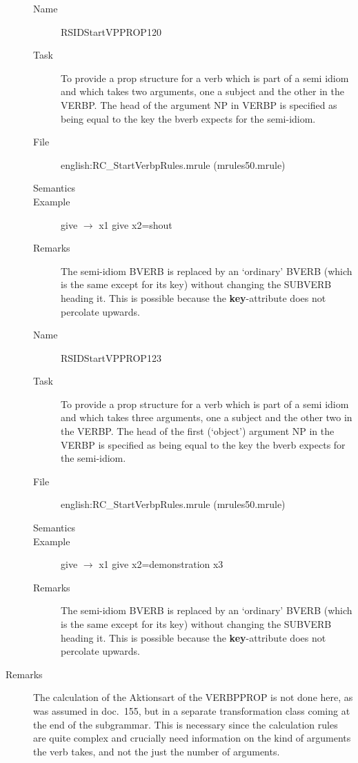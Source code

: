 \begin{description}
\vspace{1 cm}
\begin{description}
\item[Name] RSIDStartVPPROP120
\item[Task] To provide a prop structure for a verb which is part of a semi 
idiom and which takes two arguments,
one a subject and the other in the VERBP. The head of the argument NP in VERBP 
is specified as being equal to the key the bverb expects for the semi-idiom.
\item[File] english:RC\_StartVerbpRules.mrule (mrules50.mrule)
\item[Semantics]
\item[Example] give $\rightarrow$ x1 give x2=shout
\item[Remarks] The semi-idiom BVERB is replaced by an `ordinary' BVERB (which is 
the same except for its key) without changing the SUBVERB heading it. This is 
possible because the {\bf key}-attribute does not percolate upwards.
\end{description}

\vspace{1 cm}
\begin{description}
\item[Name] RSIDStartVPPROP123
\item[Task] To provide a prop structure for a verb which is part of a semi 
idiom and which takes three arguments,
one a subject and the other two in the VERBP. The head of the first (`object') 
argument NP in the VERBP is specified as being equal to the key the bverb 
expects for the semi-idiom.
\item[File] english:RC\_StartVerbpRules.mrule (mrules50.mrule)
\item[Semantics]
\item[Example] give $\rightarrow$ x1 give x2=demonstration x3
\item[Remarks] The semi-idiom BVERB is replaced by an `ordinary' BVERB (which is 
the same except for its key) without changing the SUBVERB heading it. This is 
possible because the {\bf key}-attribute does not percolate upwards.
\end{description}

\vspace{1 cm}
\item[Remarks] The calculation of the Aktionsart of the VERBPPROP is not done 
here, as was assumed in doc.\ 155, but in a separate transformation class 
coming at the end of the subgrammar. This is necessary since the calculation 
rules are quite complex and crucially need information on the kind of arguments
the verb takes, and not the just the number of arguments.
\end{description}

